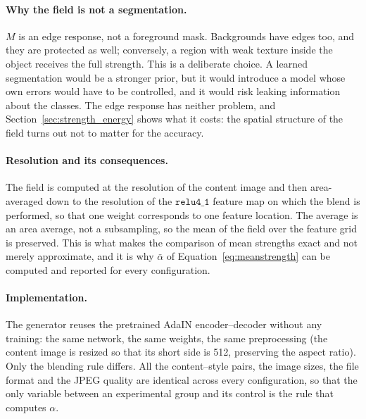 \paragraph{Why the field is not a segmentation.}
$M$ is an edge response, not a foreground mask. Backgrounds have edges
too, and they are protected as well; conversely, a region with weak texture
inside the object receives the full strength. This is a deliberate choice.
A learned segmentation would be a stronger prior, but it would introduce a
model whose own errors would have to be controlled, and it would risk
leaking information about the classes. The edge response has neither
problem, and Section~\ref{sec:strength_energy} shows what it costs: the
spatial structure of the field turns out not to matter for the accuracy.

\paragraph{Resolution and its consequences.}
The field is computed at the resolution of the content image and then
area-averaged down to the resolution of the $\texttt{relu4\_1}$ feature map
on which the blend is performed, so that one weight corresponds to one
feature location. The average is an area average, not a subsampling, so the
mean of the field over the feature grid is preserved. This is what makes the
comparison of mean strengths exact and not merely approximate, and it is
why $\bar{\alpha}$ of Equation~\eqref{eq:meanstrength} can be computed and
reported for every configuration.

\paragraph{Implementation.}
The generator reuses the pretrained AdaIN encoder--decoder without any
training: the same network, the same weights, the same preprocessing (the
content image is resized so that its short side is 512, preserving the
aspect ratio). Only the blending rule differs. All the content--style
pairs, the image sizes, the file format and the JPEG quality are identical
across every configuration, so that the only variable between an
experimental group and its control is the rule that computes $\alpha$.
